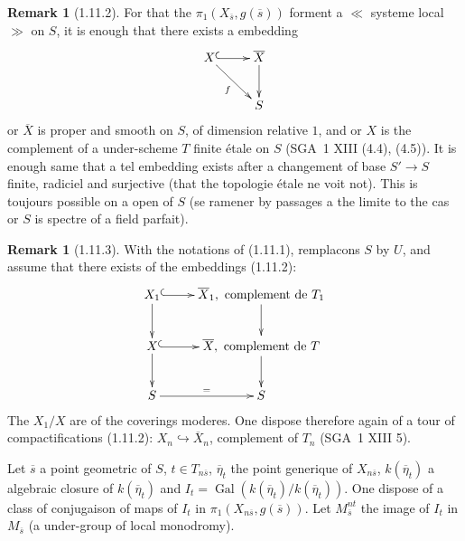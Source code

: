 \documentclass[12pt,a4paper]{article}
\theoremstyle{plain}
\theoremstyle{definition}
\newtheorem{remark}[theorem]{Remark}
\theoremstyle{definition}
\theoremstyle{remark}
\DeclareMathOperator{\Gal}{Gal}
\begin{document}
\begin{remark}[1.11.2]
For that the $\pi_1(X_{\overline{s}}, g(\overline{s}))$ forment a $\ll$ systeme local $\gg$ on $S$, it is enough that there exists a embedding
\[\xymatrix{
X \ar@{^{(}->}[r] \ar[dr]_f & \overline{X} \ar[d] \\
& S
}\]
or $\overline{X}$ is proper and smooth on $S$, of dimension relative $1$, and or $X$ is the complement of a under-scheme $T$ finite étale on $S$ (SGA~1 XIII (4.4), (4.5)). It is enough same that a tel embedding exists after a changement of base $S' \to S$ finite, radiciel and surjective (that the topologie étale ne voit not). This is toujours possible on a open of $S$ (se ramener by passages a the limite to the cas or $S$ is spectre of a field parfait).
\end{remark}

\begin{remark}[1.11.3]
With the notations of (1.11.1), remplacons $S$ by $U$, and assume that there exists of the embeddings (1.11.2):
\[\xymatrix{
X_1 \ar@{^{(}->}[r] \ar[d] & \overline{X}_1, \text{ complement de } T_1 \ar[d] \\
X \ar@{^{(}->}[r] \ar[d] & \overline{X}, \text{ complement de } T \ar[d] \\
S \ar[r]^{=} & S
}\]
The $X_1/X$ are of the coverings moderes. One dispose therefore again of a tour of compactifications (1.11.2): $X_n \hookrightarrow \overline{X}_n$, complement of $T_n$ (SGA~1 XIII 5).

Let $\overline{s}$ a point geometric of $S$, $t \in T_{n\overline{s}}$, $\overline{\eta}_t$ the point generique of $X_{n\overline{s}}$, $k(\overline{\eta}_t)$ a algebraic closure of $k(\overline{\eta}_t)$ and $I_t = \Gal(k(\overline{\eta}_t)/k(\overline{\eta}_t))$. One dispose of a class of conjugaison of maps of $I_t$ in $\pi_1(X_{n\overline{s}}, g(\overline{s}))$. Let $M_{\overline{s}}^{nt}$ the image of $I_t$ in $M_{\overline{s}}$ (a under-group of local monodromy).
\end{remark}
\end{document}
